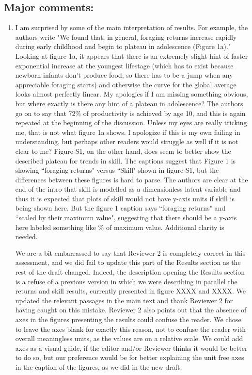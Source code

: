 \documentclass{article}
\newcommand{\rev}[1]{{\color{ForestGreen}#1}}
\begin{document}
\subsection{Major comments:}
\begin{enumerate}
    \item  I am surprised by some of the main interpretation of results. For example, the authors write "We found that, in general, foraging returns increase rapidly during early childhood and begin to plateau in adolescence (Figure 1a)." Looking at figure 1a, it appears that there is an extremely slight hint of faster exponential increase at the youngest lifestage (which has to exist because  newborn infants don't produce food, so there has to be a jump when any appreciable foraging starts) and otherwise the curve for the global average looks almost perfectly linear. My apologies if I am missing something obvious, but where exactly is there any hint of a plateau in adolescence? The authors go on to say that 72\% of productivity is achieved by age 10, and this is again repeated at the beginning of the discussion. Unless my eyes are really tricking me, that is not  what figure 1a shows. I apologize if this is my own failing in understanding, but perhaps other  readers would struggle as well if it is not clear to me? Figure S1, on the other hand, does seem to better show the described plateau for trends in skill. The captions suggest that Figure 1 is showing ``foraging returns" versus ``Skill" shown in figure S1, but the differences between these figures is hard to parse. The authors are clear at the end of  the intro that skill is modelled as a dimensionless latent variable and thus it is expected that plots of skill would not have y-axis units if skill is being shown here. But the figure 1 caption says ``foraging returns" and ``scaled by their maximum value", suggesting that there should be a y-axis here labeled something like \% of maximum value. Additional clarity is needed.
    
\rev{%
We are a bit embarrassed to say that Reviewer 2 is completely correct in this assessment, and we did fail to update this part of the Results section as the rest of the draft changed. Indeed, the description opening the Results section is a refuse of a previous version in which we were describing in parallel the returns and skill results, currently presented in figure XXXX and XXXX. We updated the relevant passages in the main text and thank Reviewer 2 for having caught on this mistake. Reviewer 2 also points out that the absence of axes in the figures presenting the results could confuse the reader. We chose to leave the axes blank for exactly this reason, not to confuse the reader with overall meaningless units, as the values are on a relative scale. We could add axes as a visual guide, if the editor and/or Reviewer thinks it would be better to do so, but our preference would be for better explaining the unit free axes in the caption of the figures, as we did in the new draft.}


\end{enumerate}
\end{document}
